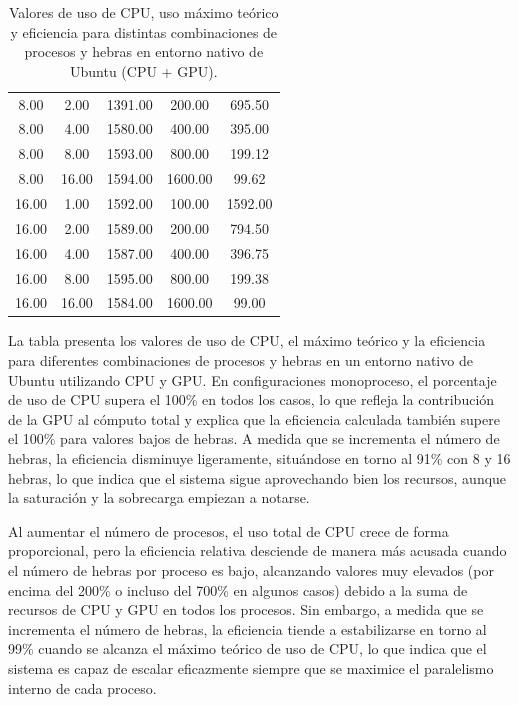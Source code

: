 \begin{table}[ht]
\begin{tabular}{|c|c|c|c|c|}
        8.00              & 2.00            & 1391.00           & 200.00            & 695.50              \\
        8.00              & 4.00            & 1580.00           & 400.00            & 395.00              \\
        8.00              & 8.00            & 1593.00           & 800.00            & 199.12              \\
        8.00              & 16.00           & 1594.00           & 1600.00           & 99.62               \\
        16.00             & 1.00            & 1592.00           & 100.00            & 1592.00             \\
        16.00             & 2.00            & 1589.00           & 200.00            & 794.50              \\
        16.00             & 4.00            & 1587.00           & 400.00            & 396.75              \\
        16.00             & 8.00            & 1595.00           & 800.00            & 199.38              \\
        16.00             & 16.00           & 1584.00           & 1600.00           & 99.00               \\
        \hline
    \end{tabular}
    \caption{Valores de uso de CPU, uso máximo teórico y eficiencia para distintas combinaciones de procesos y hebras en entorno nativo de Ubuntu (CPU + GPU).}
    \label{tab:thread_sweep_ubuntu_gpu_native_cpu}
\end{table}

La tabla presenta los valores de uso de CPU, el máximo teórico y la eficiencia para diferentes combinaciones de procesos y hebras en un entorno nativo de Ubuntu utilizando CPU y GPU. En configuraciones monoproceso, el porcentaje de uso de CPU supera el 100\% en todos los casos, lo que refleja la contribución de la GPU al cómputo total y explica que la eficiencia calculada también supere el 100\% para valores bajos de hebras. A medida que se incrementa el número de hebras, la eficiencia disminuye ligeramente, situándose en torno al 91\% con 8 y 16 hebras, lo que indica que el sistema sigue aprovechando bien los recursos, aunque la saturación y la sobrecarga empiezan a notarse.

Al aumentar el número de procesos, el uso total de CPU crece de forma proporcional, pero la eficiencia relativa desciende de manera más acusada cuando el número de hebras por proceso es bajo, alcanzando valores muy elevados (por encima del 200\% o incluso del 700\% en algunos casos) debido a la suma de recursos de CPU y GPU en todos los procesos. Sin embargo, a medida que se incrementa el número de hebras, la eficiencia tiende a estabilizarse en torno al 99\% cuando se alcanza el máximo teórico de uso de CPU, lo que indica que el sistema es capaz de escalar eficazmente siempre que se maximice el paralelismo interno de cada proceso.

